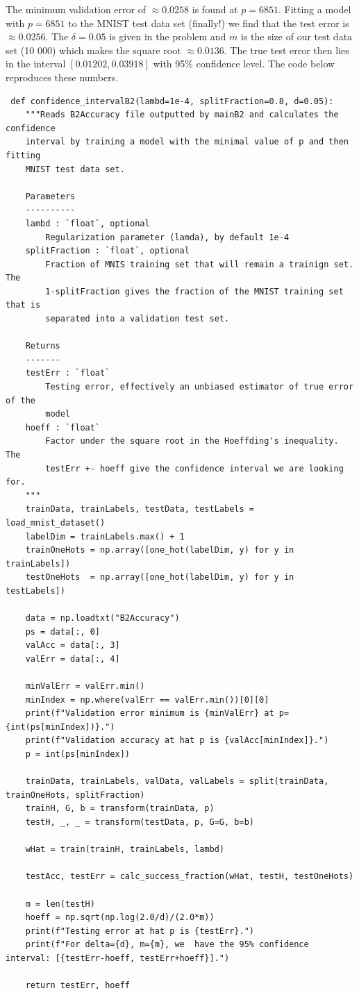 \documentclass{article}
\newcommand{\1}{\mathbf{1}}
\begin{document}
\begin{enumerate}
    The minimum validation error of $\approx 0.0258$ is found at $p=6851$. Fitting a model with $p=6851$ to the MNIST test data set (finally!) we find that the test error is $\approx 0.0256$. The $\delta=0.05$ is given in the problem and $m$ is the size of our test data set (10 000) which makes the square root $\approx 0.0136$. The true test error then lies in the interval $[0.01202, 0.03918]$ with 95\% confidence level. The code below reproduces these numbers. 
    
\begin{lstlisting}
 def confidence_intervalB2(lambd=1e-4, splitFraction=0.8, d=0.05):
    """Reads B2Accuracy file outputted by mainB2 and calculates the confidence
    interval by training a model with the minimal value of p and then fitting
    MNIST test data set.

    Parameters
    ----------
    lambd : `float`, optional
        Regularization parameter (lamda), by default 1e-4
    splitFraction : `float`, optional
        Fraction of MNIS training set that will remain a trainign set. The
        1-splitFraction gives the fraction of the MNIST training set that is
        separated into a validation test set.

    Returns
    -------
    testErr : `float`
        Testing error, effectively an unbiased estimator of true error of the
        model
    hoeff : `float`
        Factor under the square root in the Hoeffding's inequality. The
        testErr +- hoeff give the confidence interval we are looking for.
    """
    trainData, trainLabels, testData, testLabels = load_mnist_dataset()
    labelDim = trainLabels.max() + 1 
    trainOneHots = np.array([one_hot(labelDim, y) for y in trainLabels])
    testOneHots  = np.array([one_hot(labelDim, y) for y in testLabels])

    data = np.loadtxt("B2Accuracy")
    ps = data[:, 0]
    valAcc = data[:, 3]
    valErr = data[:, 4]

    minValErr = valErr.min()
    minIndex = np.where(valErr == valErr.min())[0][0]
    print(f"Validation error minimum is {minValErr} at p={int(ps[minIndex])}.")
    print(f"Validation accuracy at hat p is {valAcc[minIndex]}.")
    p = int(ps[minIndex])

    trainData, trainLabels, valData, valLabels = split(trainData, trainOneHots, splitFraction)
    trainH, G, b = transform(trainData, p)
    testH, _, _ = transform(testData, p, G=G, b=b)

    wHat = train(trainH, trainLabels, lambd)

    testAcc, testErr = calc_success_fraction(wHat, testH, testOneHots)

    m = len(testH)
    hoeff = np.sqrt(np.log(2.0/d)/(2.0*m))
    print(f"Testing error at hat p is {testErr}.")
    print(f"For delta={d}, m={m}, we  have the 95% confidence interval: [{testErr-hoeff, testErr+hoeff}].")

    return testErr, hoeff
\end{lstlisting}{}

\end{enumerate}
\end{document}
